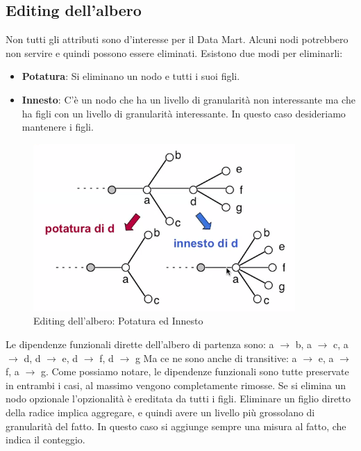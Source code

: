 \subsection{Editing dell'albero}
Non tutti gli attributi sono d'interesse per il Data Mart. Alcuni nodi potrebbero non servire e quindi possono essere eliminati. Esistono due modi per eliminarli:
\begin{itemize}
	\item \textbf{Potatura}: Si eliminano un nodo e tutti i suoi figli.
	\item \textbf{Innesto}: C'è un nodo che ha un livello di granularità non interessante ma che ha figli con un livello di granularità interessante. In questo caso desideriamo mantenere i figli.
\end{itemize}

\begin{figure}[H]
	\begin{center}
		\includegraphics[width=0.4\linewidth]{img/potinnest.PNG}		\caption{Editing dell'albero: Potatura ed Innesto}
	\end{center}
\end{figure}
\noindent Le dipendenze funzionali dirette dell'albero di partenza sono:
\newline
a $\xrightarrow{}$ b, a $\xrightarrow{}$ c, a $\xrightarrow{}$ d, d $\xrightarrow{}$ e, d $\xrightarrow{}$ f, d $\xrightarrow{}$ g\newline
Ma ce ne sono anche di transitive:\newline
a $\xrightarrow{}$ e, a $\xrightarrow{}$ f, a $\xrightarrow{}$ g.\newline
Come possiamo notare, le dipendenze funzionali sono tutte preservate in entrambi i casi, al massimo vengono completamente rimosse.\newline
Se si elimina un nodo opzionale l'opzionalità è ereditata da tutti i figli.\newline
Eliminare un figlio diretto della radice implica aggregare, e quindi avere un livello più grossolano di granularità del fatto. In questo caso si aggiunge sempre una misura al fatto, che indica il conteggio.\newline
